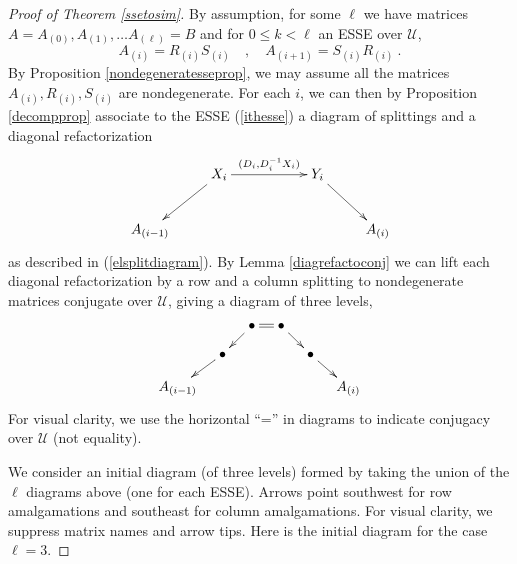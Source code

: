 \documentclass{amsart}
\theoremstyle{definition}
\theoremstyle{remark}
\numberwithin{equation}{section}
\begin{document}
{{\begin{proof}[Proof of Theorem 
\ref{ssetosim}] 
By assumption, for some $\ell$  we have 
 matrices 
\newline 
$A=A_{(0)},A_{(1)},\dots A_{(\ell )}=B$
and for $0\leq k<\ell $ an ESSE over  $\mathcal U$, 
\begin{equation} \label{ithesse}
A_{(i)}=R_{(i)}S_{(i)} \quad , \quad A_{(i+1)}=S_{(i)}R_{(i)}  \ . 
\end{equation} 
By Proposition \ref{nondegeneratesseprop}, we may assume all the 
matrices $A_{(i)},R_{(i)},S_{(i)}$ are nondegenerate. 
For each $i$, we can then 
by Proposition 
\ref{decompprop} 
 associate to the ESSE (\ref{ithesse}) a diagram of splittings 
and a diagonal refactorization 
\begin{equation} \label{diagram1} 
\xymatrix{ 
       & X_i \ar[rr]^-{(D_i, D_i^{-1}X_i)} 
\ar[dl]   &  & Y_i\ar[dr]  &     \\ 
A_{(i-1)}      &                                          &  
&                   &  A_{(i)} 
}
\end{equation}
 as described in 
(\ref{elsplitdiagram}). By  Lemma \ref{diagrefactoconj}  
we can lift each diagonal refactorization by a row and a column 
splitting to nondegenerate matrices conjugate over $\mathcal U$, giving a diagram 
of three levels, 
\begin{equation}
\xymatrix@=10pt{ 
    &                        & \bullet  \ar[dl] \ar@{=}[r] & \bullet \ar[dr] &                & \\
    & \bullet        \ar[dl] &                             &               & \bullet \ar[dr] &  \\
A_{(i-1)} &                    &                             &               &                 &   A_{(i)}}
\end{equation} 
For visual clarity, we use the horizontal 
 ``=''  in diagrams to indicate conjugacy over $\mathcal U$ (not equality). 

We consider an initial diagram 
(of three levels) formed by taking the union of the $\ell$ diagrams above
 (one for each ESSE). 
Arrows point southwest for row amalgamations and southeast 
for column amalgamations. 
For visual clarity, we suppress matrix names and arrow tips.
 Here is the initial diagram for 
the case $\ell =3$. 


\end{proof}}}
\end{document}
